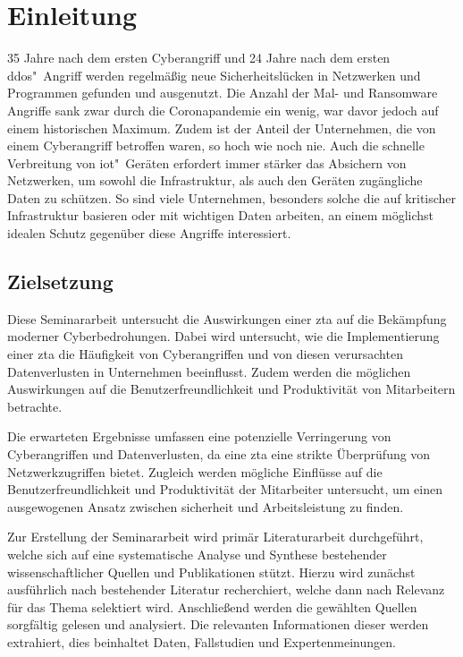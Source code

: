 \section{Einleitung}\label{sec:einleitung}

35 Jahre nach dem ersten Cyberangriff und 24 Jahre nach dem ersten \gls{ddos}"~Angriff werden regelmäßig neue Sicherheitslücken in Netzwerken und Programmen gefunden und ausgenutzt.
Die Anzahl der Mal- und Ransomware Angriffe sank zwar durch die Coronapandemie ein wenig, war davor jedoch auf einem historischen Maximum.
Zudem ist der Anteil der Unternehmen, die von einem Cyberangriff betroffen waren, so hoch wie noch nie.
Auch die schnelle Verbreitung von \gls{iot}"~Geräten erfordert immer stärker das Absichern von Netzwerken, um sowohl die Infrastruktur, als auch den Geräten zugängliche Daten zu schützen.
So sind viele Unternehmen, besonders solche die auf kritischer Infrastruktur basieren oder mit wichtigen Daten arbeiten, an einem möglichst idealen Schutz gegenüber diese Angriffe interessiert.

\subsection{Zielsetzung}\label{subsec:zielsetzung}
Diese Seminararbeit untersucht die Auswirkungen einer \gls{zta} auf die Bekämpfung moderner Cyberbedrohungen.
Dabei wird untersucht, wie die Implementierung einer \gls{zta} die Häufigkeit von Cyberangriffen und von diesen verursachten Datenverlusten in Unternehmen beeinflusst.
Zudem werden die möglichen Auswirkungen auf die Benutzerfreundlichkeit und Produktivität von Mitarbeitern betrachte.

Die erwarteten Ergebnisse umfassen eine potenzielle Verringerung von Cyberangriffen und Datenverlusten, da eine \gls{zta} eine strikte Überprüfung von Netzwerkzugriffen bietet.
Zugleich werden mögliche Einflüsse auf die Benutzerfreundlichkeit und Produktivität der Mitarbeiter untersucht, um einen ausgewogenen Ansatz zwischen sicherheit und Arbeitsleistung zu finden.

Zur Erstellung der Seminararbeit wird primär Literaturarbeit durchgeführt, welche sich auf eine systematische Analyse und Synthese bestehender wissenschaftlicher Quellen und Publikationen stützt.
Hierzu wird zunächst ausführlich nach bestehender Literatur recherchiert, welche dann nach Relevanz für das Thema selektiert wird.
Anschließend werden die gewählten Quellen sorgfältig gelesen und analysiert.
Die relevanten Informationen dieser werden extrahiert, dies beinhaltet Daten, Fallstudien und Expertenmeinungen.


